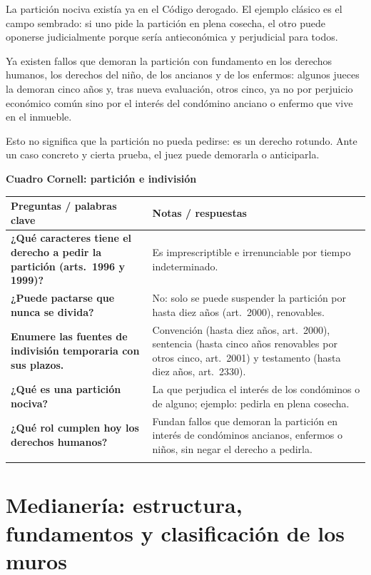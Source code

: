 \documentclass[12pt,oneside]{book}
\renewcommand{\arraystretch}{1.25}
\newcommand{\cq}[2]{\textbf{#1} & #2 \\[0.45em]}
\newcommand{\cornell}[3]{%
\par\bigskip\noindent\textbf{\large Cuadro Cornell: #1}\par\smallskip
\begin{center}
\small
\renewcommand{\arraystretch}{1.15}
\begin{tabularx}{\textwidth}{>{\raggedright\arraybackslash}p{0.27\textwidth}>{\raggedright\arraybackslash}X}
\toprule
\textbf{Preguntas / palabras clave} & \textbf{Notas / respuestas} \\
\midrule
#2
\midrule
\multicolumn{2}{p{\dimexpr\textwidth-2\tabcolsep\relax}}{\textbf{Resumen.} #3} \\
\bottomrule
\end{tabularx}
\end{center}
}
\begin{document}
La partición nociva existía ya en el Código derogado. El ejemplo clásico es el campo sembrado: si uno pide la partición en plena cosecha, el otro puede oponerse judicialmente porque sería antieconómica y perjudicial para todos.

\begin{importante}
Ya existen fallos que demoran la partición con fundamento en los derechos humanos, los derechos del niño, de los ancianos y de los enfermos: algunos jueces la demoran cinco años y, tras nueva evaluación, otros cinco, ya no por perjuicio económico común sino por el interés del condómino anciano o enfermo que vive en el inmueble.
\end{importante}

Esto no significa que la partición no pueda pedirse: es un derecho rotundo. Ante un caso concreto y cierta prueba, el juez puede demorarla o anticiparla.

\cornell{partición e indivisión}{
\cq{¿Qué caracteres tiene el derecho a pedir la partición (arts.~1996 y 1999)?}{Es imprescriptible e irrenunciable por tiempo indeterminado.}
\cq{¿Puede pactarse que nunca se divida?}{No: solo se puede suspender la partición por hasta diez años (art.~2000), renovables.}
\cq{Enumere las fuentes de indivisión temporaria con sus plazos.}{Convención (hasta diez años, art.~2000), sentencia (hasta cinco años renovables por otros cinco, art.~2001) y testamento (hasta diez años, art.~2330).}
\cq{¿Qué es una partición nociva?}{La que perjudica el interés de los condóminos o de alguno; ejemplo: pedirla en plena cosecha.}
\cq{¿Qué rol cumplen hoy los derechos humanos?}{Fundan fallos que demoran la partición en interés de condóminos ancianos, enfermos o niños, sin negar el derecho a pedirla.}
}{La partición puede pedirse siempre salvo indivisión forzosa, que solo la ley establece, con fuentes convencional, judicial o testamentaria de plazo máximo diez o cinco años. La partición nociva y los derechos humanos permiten demorarla o anticiparla según el caso.}

\chapter[Medianería: estructura, fundamentos y clasificación de los muros]{Medianería: estructura, fundamentos y clasificación de los muros}\label{cap:medianeria}
\end{document}
